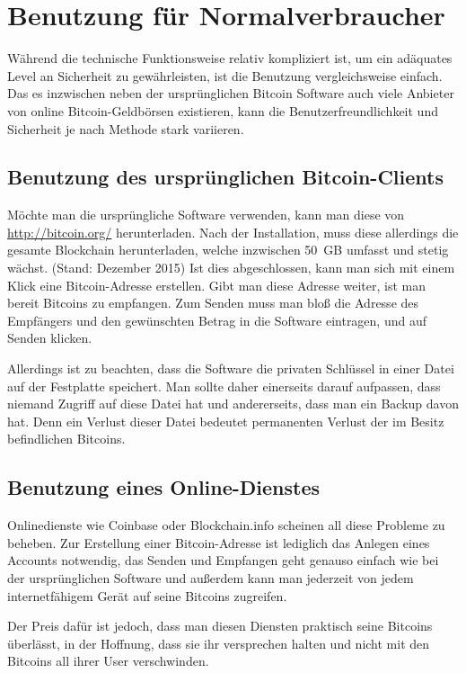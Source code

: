 \section{Benutzung für Normalverbraucher}

Während die technische Funktionsweise relativ kompliziert ist, um ein adäquates Level an Sicherheit zu gewährleisten, ist die Benutzung vergleichsweise einfach.
Das es inzwischen neben der ursprünglichen Bitcoin Software auch viele Anbieter von online Bitcoin-Geldbörsen existieren, kann die Benutzerfreundlichkeit und Sicherheit je nach Methode stark variieren.

\subsection{Benutzung des ursprünglichen Bitcoin-Clients}

Möchte man die ursprüngliche Software verwenden, kann man diese von \url{http://bitcoin.org/} herunterladen.
Nach der Installation, muss diese allerdings die gesamte Blockchain herunterladen, welche inzwischen 50~GB umfasst und stetig wächst. (Stand: Dezember 2015)
Ist dies abgeschlossen, kann man sich mit einem Klick eine Bitcoin-Adresse erstellen.
Gibt man diese Adresse weiter, ist man bereit Bitcoins zu empfangen.
Zum Senden muss man bloß die Adresse des Empfängers und den gewünschten Betrag in die Software eintragen, und auf Senden klicken.

Allerdings ist zu beachten, dass die Software die privaten Schlüssel in einer Datei auf der Festplatte speichert.
Man sollte daher einerseits darauf aufpassen, dass niemand Zugriff auf diese Datei hat und andererseits, dass man ein Backup davon hat.
Denn ein Verlust dieser Datei bedeutet permanenten Verlust der im Besitz befindlichen Bitcoins.

\subsection{Benutzung eines Online-Dienstes}

Onlinedienste wie Coinbase oder Blockchain.info scheinen all diese Probleme zu beheben.
Zur Erstellung einer Bitcoin-Adresse ist lediglich das Anlegen eines Accounts notwendig, das Senden und Empfangen geht genauso einfach wie bei der ursprünglichen Software und außerdem kann man jederzeit von jedem internetfähigem Gerät auf seine Bitcoins zugreifen.

Der Preis dafür ist jedoch, dass man diesen Diensten praktisch seine Bitcoins überlässt, in der Hoffnung, dass sie ihr versprechen halten und nicht mit den Bitcoins all ihrer User verschwinden.
